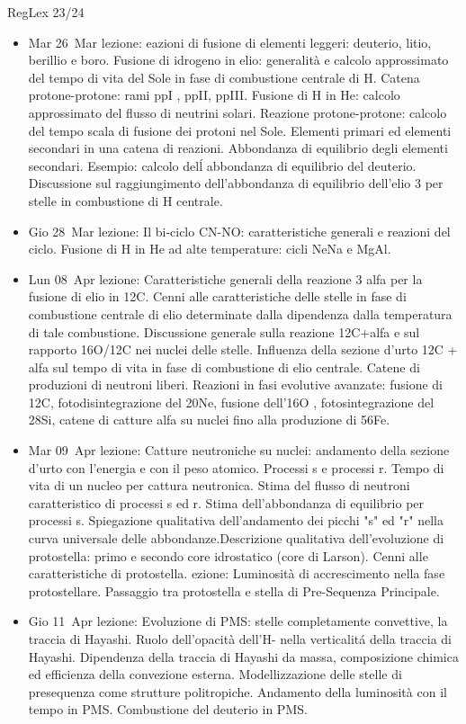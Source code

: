 \begin{frame}[allowframebreaks]{RegLex 23/24}
\begin{itemize}
\item Mar 26 Mar lezione: eazioni di fusione di elementi leggeri: deuterio, litio, berillio e boro. Fusione di idrogeno in elio: generalità e calcolo approssimato del tempo di vita del Sole in fase di combustione centrale di H. Catena protone-protone: rami ppI , ppII, ppIII. Fusione di H in He: calcolo approssimato del flusso di neutrini solari. Reazione protone-protone: calcolo del tempo scala di fusione dei protoni nel Sole. Elementi primari ed elementi secondari in una catena di reazioni. Abbondanza di equilibrio degli elementi secondari. Esempio: calcolo del\'l abbondanza di equilibrio del deuterio. Discussione sul raggiungimento dell'abbondanza di equilibrio dell'elio 3 per stelle in combustione di H centrale. 
\item Gio 28 Mar lezione: Il bi-ciclo CN-NO: caratteristiche generali e reazioni del ciclo. Fusione di H in He ad alte temperature: cicli NeNa e MgAl. 
\item Lun 08 Apr lezione: Caratteristiche generali della reazione 3 alfa per la fusione di elio in 12C. Cenni alle caratteristiche delle stelle in fase di combustione centrale di elio determinate dalla dipendenza dalla temperatura di tale combustione. Discussione generale sulla reazione 12C+alfa e sul rapporto 16O/12C nei nuclei delle stelle. Influenza della sezione d'urto 12C + alfa sul tempo di vita in fase di combustione di elio centrale. Catene di produzioni di neutroni liberi. Reazioni in fasi evolutive avanzate: fusione di 12C, fotodisintegrazione del 20Ne, fusione dell'16O , fotosintegrazione del 28Si, catene di catture alfa su nuclei fino alla produzione di 56Fe. 
\item Mar 09 Apr lezione: Catture neutroniche su nuclei: andamento della sezione d'urto con l'energia e con il peso atomico. Processi s e processi r. Tempo di vita di un nucleo per cattura neutronica. Stima del flusso di neutroni caratteristico di processi s ed r. Stima dell'abbondanza di equilibrio per processi s. Spiegazione qualitativa dell'andamento dei picchi "s" ed "r" nella curva universale delle abbondanze.Descrizione qualitativa dell'evoluzione di protostella: primo e secondo core idrostatico (core di Larson). Cenni alle caratteristiche di protostella. ezione: Luminosità di accrescimento nella fase protostellare. Passaggio tra protostella e stella di Pre-Sequenza Principale. 
\item Gio 11 Apr lezione: Evoluzione di PMS: stelle completamente convettive, la traccia di Hayashi. Ruolo dell'opacità dell'H- nella verticalit\'a della traccia di Hayashi. Dipendenza della traccia di Hayashi da massa, composizione chimica ed efficienza della convezione esterna. Modellizzazione delle stelle di presequenza come strutture politropiche. Andamento della luminosità con il tempo in PMS. Combustione del deuterio in PMS. 

\end{itemize}
\end{frame}
